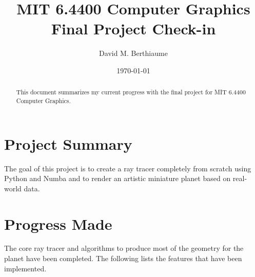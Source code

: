 \documentclass{amsart}
\title{MIT 6.4400 Computer Graphics Final Project Check-in}
\author{David M. Berthiaume}
\date{\today}
\begin{document}
\maketitle

\begin{abstract}
This document summarizes my current progress with the final project for MIT 6.4400 Computer Graphics. 
\end{abstract}

\tableofcontents



\section{Project Summary}

The goal of this project is to create a ray tracer completely from scratch using Python and Numba and to render an artistic miniature planet based on real-world data.


\section{Progress Made}
The core ray tracer and algorithms to produce most of the geometry for the planet have been completed. 
The following lists the features that have been implemented.
\end{document}
